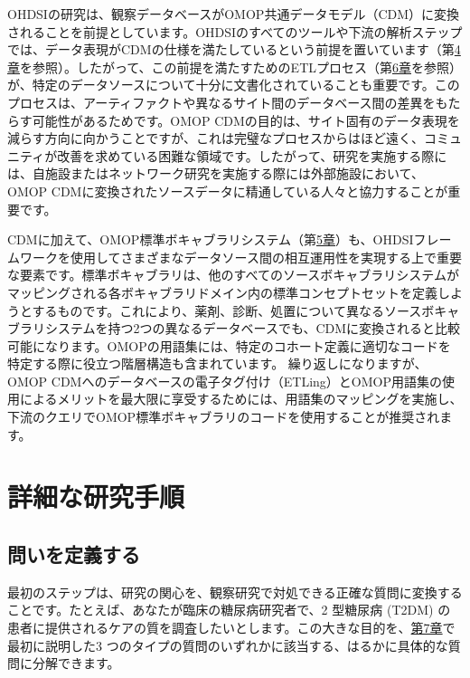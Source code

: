 \documentclass[
  11pt]{book}
\theoremstyle{definition}
\theoremstyle{definition}
\theoremstyle{definition}
\theoremstyle{definition}
\theoremstyle{remark}
\begin{document}
OHDSIの研究は、観察データベースがOMOP共通データモデル（CDM）に変換されることを前提としています。OHDSIのすべてのツールや下流の解析ステップでは、データ表現がCDMの仕様を満たしているという前提を置いています（第\href{https://ohdsi.github.io/TheBookOfOhdsi/CommonDataModel.html\#CommonDataModel}{4章}を参照）。したがって、この前提を満たすためのETLプロセス（第\href{https://ohdsi.github.io/TheBookOfOhdsi/ExtractTransformLoad.html\#ExtractTransformLoad}{6章}を参照）が、特定のデータソースについて十分に文書化されていることも重要です。このプロセスは、アーティファクトや異なるサイト間のデータベース間の差異をもたらす可能性があるためです。OMOP CDMの目的は、サイト固有のデータ表現を減らす方向に向かうことですが、これは完璧なプロセスからはほど遠く、コミュニティが改善を求めている困難な領域です。したがって、研究を実施する際には、自施設またはネットワーク研究を実施する際には外部施設において、OMOP CDMに変換されたソースデータに精通している人々と協力することが重要です。

CDMに加えて、OMOP標準ボキャブラリシステム（第\href{https://ohdsi.github.io/TheBookOfOhdsi/StandardizedVocabularies.html\#StandardizedVocabularies}{5章}）も、OHDSIフレームワークを使用してさまざまなデータソース間の相互運用性を実現する上で重要な要素です。標準ボキャブラリは、他のすべてのソースボキャブラリシステムがマッピングされる各ボキャブラリドメイン内の標準コンセプトセットを定義しようとするものです。これにより、薬剤、診断、処置について異なるソースボキャブラリシステムを持つ2つの異なるデータベースでも、CDMに変換されると比較可能になります。OMOPの用語集には、特定のコホート定義に適切なコードを特定する際に役立つ階層構造も含まれています。 繰り返しになりますが、OMOP CDMへのデータベースの電子タグ付け（ETLing）とOMOP用語集の使用によるメリットを最大限に享受するためには、用語集のマッピングを実施し、下流のクエリでOMOP標準ボキャブラリのコードを使用することが推奨されます。

\section{詳細な研究手順}\label{ux8a73ux7d30ux306aux7814ux7a76ux624bux9806}

\subsection{問いを定義する}\label{ux554fux3044ux3092ux5b9aux7fa9ux3059ux308b}

最初のステップは、研究の関心を、観察研究で対処できる正確な質問に変換することです。たとえば、あなたが臨床の糖尿病研究者で、2 型糖尿病 (T2DM) の患者に提供されるケアの質を調査したいとします。この大きな目的を、\href{https://ohdsi.github.io/TheBookOfOhdsi/DataAnalyticsUseCases.html\#DataAnalyticsUseCases}{第7章}で最初に説明した3 つのタイプの質問のいずれかに該当する、はるかに具体的な質問に分解できます。
\end{document}
